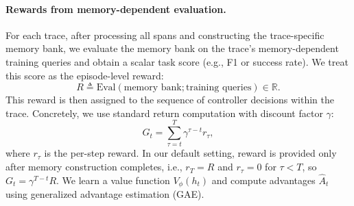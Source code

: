 \paragraph{Rewards from memory-dependent evaluation.}
For each trace, after processing all spans and constructing the trace-specific memory bank, we evaluate the memory bank on the trace's memory-dependent training queries and obtain a scalar task score (e.g., F1 or success rate). We treat this score as the episode-level reward:
\begin{equation}
R \triangleq \mathrm{Eval}(\text{memory bank}; \text{training queries}) \in \mathbb{R}.
\end{equation}
This reward is then assigned to the sequence of controller decisions within the trace. Concretely, we use standard return computation with discount factor $\gamma$:
\begin{equation}
G_t=\sum_{\tau=t}^{T}\gamma^{\tau-t}r_\tau,
\end{equation}
where $r_\tau$ is the per-step reward. In our default setting, reward is provided only after memory construction completes, i.e., $r_T=R$ and $r_\tau=0$ for $\tau<T$, so $G_t=\gamma^{T-t}R$.
We learn a value function $V_\phi(h_t)$ and compute advantages $\hat{A}_t$ using generalized advantage estimation (GAE).

